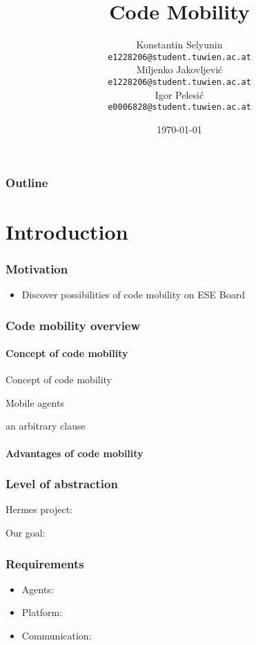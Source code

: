 \documentclass{beamer}
\title[Code Mobility]{Code Mobility}
\date{\today}
\author[Jakovljevi\'c,Selyunin,Pelesi\'c]{
 \Large{Konstantin Selyunin}\\
  \small{\texttt{e1228206@student.tuwien.ac.at}}\\
 \Large{Miljenko Jakovljevi\'c}\\
  \small{\texttt{e1228206@student.tuwien.ac.at}}\\
  \Large{Igor Pelesi\'c}\\
  \small{\texttt{e0006828@student.tuwien.ac.at}}\\
}
\theoremstyle{definition} \newtheorem{mdefinition}{Definition}
\theoremstyle{plain} \newtheorem{mtheorem}{Theorem}
\theoremstyle{plain} \newtheorem{mcorollary}{Corollary}
\theoremstyle{plain} \newtheorem{mfact}{Fact}
\begin{document}

\begin{frame}
	\titlepage
\end{frame}

\begin{frame}
	\frametitle{Outline}
	\tableofcontents
\end{frame}

\section{Introduction}

\begin{frame}[fragile]
	\frametitle{Motivation}
	\begin{itemize}
		\item Discover possibilities of code mobility on ESE Board
	\end{itemize}
\end{frame}


\begin{frame}
	\frametitle{Code mobility overview}
 		\framesubtitle{Concept of code mobility}
	\begin{block}{Concept of code mobility}
		\begin{description}
			\item	Mobile agents
			\item	
			\item	an arbitrary clause
		\end{description}
	\end{block}

		\framesubtitle{Advantages of code mobility}

\end{frame}

\begin{frame}
\frametitle{Level of abstraction}

Hermes project:

Our goal:
	

\end{frame}

\begin{frame}
	\frametitle{Requirements}
\begin{itemize}
	\item Agents:
	\item Platform:
	\item Communication:
\end{itemize}
\end{frame}
\end{document}
